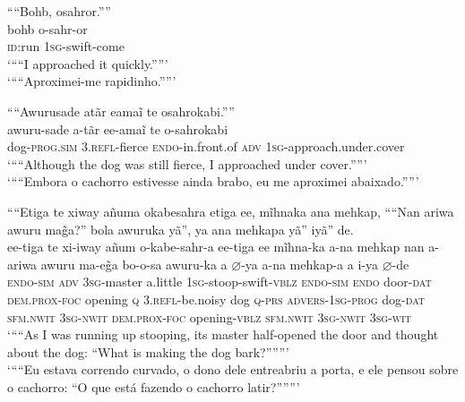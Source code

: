 \documentclass[output=paper,
modfonts,nonflat
]{langsci/langscibook}
\begin{document}
\largerpage[-2]
\ea ““Bohb, osahror.””\\[.3em]
\gll bohb o-sahr-or\\
\textsc{id}:run \textsc{1sg}-swift-come\\
\glt ‘““I approached it quickly.””’\\
\glt ‘““Aproximei-me rapidinho.””’\\
\z

\newpage
\ea ““Awurusade atãr eamaĩ te osahrokabi.””\\[.3em]
\gll awuru-sade a-tãr ee-amaĩ{\footnotemark} te o-sahrokabi\\
dog-\textsc{prog.sim} \textsc{3.refl}-fierce \textsc{endo}-in.front.of \textsc{adv} \textsc{1sg}-approach.under.cover\\
\glt ‘““Although the dog was still fierce, I approached under cover.””’\\
\glt ‘““Embora o cachorro estivesse ainda brabo, eu me aproximei abaixado.””’\\
\z

\ea ““Etiga te xiway añuma okabesahra etiga ee, mĩhnaka ana mehkap, ““Nan ariwa awuru ma\~{g}a?” bola awuruka yã”, ya ana mehkapa yã” iyã” de.\\[.3em]
\gll ee-tiga te xi-iway añum o-kabe-sahr-a ee-tiga ee mĩhna-ka a-na mehkap nan a-ariwa awuru ma-e\~{g}a bo-o-sa awuru-ka a \(\varnothing\)-ya a-na mehkap-a a i-ya \(\varnothing\)-de\\
\textsc{endo-sim} \textsc{adv} \textsc{3sg}-master a.little \textsc{1sg}-stoop-swift-\textsc{vblz} \textsc{endo-sim} \textsc{endo} door-\textsc{dat} \textsc{dem.prox-foc} opening \textsc{q} \textsc{3.refl}-be.noisy dog \textsc{q-prs} \textsc{advers-1sg-prog} dog-\textsc{dat} \textsc{sfm.nwit} \textsc{3sg-nwit}{\footnotemark} \textsc{dem.prox-foc} opening-\textsc{vblz} \textsc{sfm.nwit} \textsc{3sg-nwit} \textsc{3sg-wit}\\
\glt ‘““As I was running up stooping, its master half-opened the door and thought about the dog: “What is making the dog bark?”””’\\
\glt ‘““Eu estava correndo curvado, o dono dele entreabriu a porta, e ele pensou sobre o cachorro: “O que está fazendo o cachorro latir?”””’\\
\z
\end{document}
